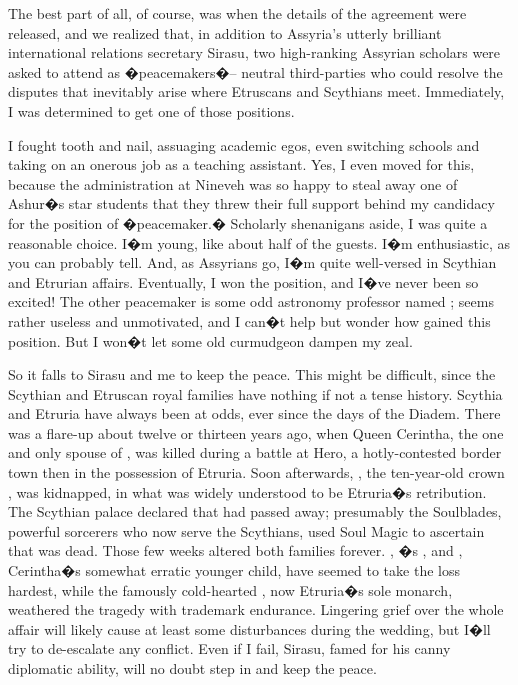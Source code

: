 \documentclass[char]{Kos}
\begin{document}
The best part of all, of course, was when the details of the agreement were released, and we realized that, in addition to Assyria's utterly brilliant international relations secretary Sirasu, two high-ranking Assyrian scholars were asked to attend as �peacemakers�-- neutral third-parties who could resolve the disputes that inevitably arise where Etruscans and Scythians meet. Immediately, I was determined to get one of those positions.

I fought tooth and nail, assuaging academic egos, even switching schools and taking on an onerous job as a teaching assistant. Yes, I even moved for this, because the administration at Nineveh was so happy to steal away one of Ashur�s star students that they threw their full support behind my candidacy for the position of �peacemaker.� Scholarly shenanigans aside, I was quite a reasonable choice. I�m young, like about half of the guests. I�m enthusiastic, as you can probably tell. And, as Assyrians go, I�m quite well-versed in Scythian and Etrurian affairs. Eventually, I won the position, and I�ve never been so excited! The other peacemaker is some odd astronomy professor named \cAnarchist{\name}; \cAnarchist{\they} seems rather useless and unmotivated, and I can�t help but wonder how \cAnarchist{\they} gained this position. But I won�t let some old curmudgeon dampen my zeal.

So it falls to Sirasu and me to keep the peace. This might be difficult, since the Scythian and Etruscan royal families have nothing if not a tense history. Scythia and Etruria have always been at odds, ever since the days of the Diadem. There was a flare-up about twelve or thirteen years ago, when Queen Cerintha, the one and only spouse of \cEtruriaKing{\name}, was killed during a battle at Hero, a hotly-contested border town then in the possession of Etruria. Soon afterwards, \cFugitive{\name}, the ten-year-old crown \cFugitive{\prince}, was kidnapped, in what was widely understood to be Etruria�s retribution. The Scythian palace declared that \cFugitive{\nickname} had passed away; presumably the Soulblades, powerful sorcerers who now serve the Scythians, used Soul Magic to ascertain that \cFugitive{\they} was dead. Those few weeks altered both families forever. \cScythiaQueen{\nickname}, \cFugitive{\name}�s \cScythiaQueen{\parent}, and \cPoet{\nickname}, Cerintha�s somewhat erratic younger child, have seemed to take the loss hardest, while the famously cold-hearted \cEtruriaKing{\name}, now Etruria�s sole monarch, weathered the tragedy with \cEtruriaKing{\their} trademark endurance. Lingering grief over the whole affair will likely cause at least some disturbances during the wedding, but I�ll try to de-escalate any conflict. Even if I fail, Sirasu, famed for his canny diplomatic ability, will no doubt step in and keep the peace.
\end{document}
